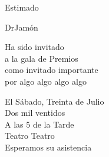 \documentclass[12pt]{article}
\newcommand{\fancy}{\calligra\small}
\newcommand{\block}{\sc\scriptsize}
\begin{document}
	\vspace*{\fill}
	\begin{center}
		
		\vspace{-0.5\baselineskip}
		
		
		\begin{singlespacing}
			{\fancy Estimado}\\
		\end{singlespacing}
		
		\begin{onehalfspacing}
			{\block DrJamón} \\
		\end{onehalfspacing}
		
		\begin{singlespacing}
			{\fancy Ha sido invitado  \\ a la gala de Premios \\ como invitado importante \\ por algo algo algo algo} \\ 
		\end{singlespacing}
		
		
		
		\begin{singlespacing}
			{\fancy El } {\block Sábado, Treinta de Julio}\\
			{\block Dos mil ventidos}\\
			{\fancy A las} {\block 5 de la Tarde}\\
			{\block Teatro Teatro}\\
			\vspace{0.5\baselineskip}
			{\fancy Esperamos su asistencia}\\
			
			\vspace{0.5\baselineskip}
		\end{singlespacing}

	

	\end{center}
	\vspace*{\fill}
\end{document}
